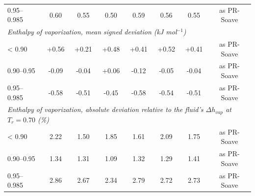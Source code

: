 \begin{table}[H]
\begin{tabular}{lccccccc}
0.95–0.985 & 0.60 & 0.55 & 0.50 & 0.59 & 0.56 & 0.55 & as PR-Soave \\
\multicolumn{8}{l}{\emph{Enthalpy of vaporization, mean signed deviation (kJ mol$^{-1}$)}} \\
< 0.90 & +0.56 & +0.21 & +0.48 & +0.41 & +0.52 & +0.41 & as PR-Soave \\
0.90–0.95 & -0.09 & -0.04 & +0.06 & -0.12 & -0.05 & -0.04 & as PR-Soave \\
0.95–0.985 & -0.58 & -0.51 & -0.45 & -0.58 & -0.54 & -0.51 & as PR-Soave \\
\multicolumn{8}{l}{\emph{Enthalpy of vaporization, absolute deviation relative to the fluid's $\Delta h_{vap}$ at $T_r = 0.70$ (\%)}} \\
< 0.90 & 2.22 & 1.50 & 1.85 & 1.61 & 2.09 & 1.75 & as PR-Soave \\
0.90–0.95 & 1.34 & 1.31 & 1.09 & 1.32 & 1.29 & 1.41 & as PR-Soave \\
0.95–0.985 & 2.86 & 2.67 & 2.34 & 2.79 & 2.72 & 2.73 & as PR-Soave \\
\bottomrule
\end{tabular}
\end{table}
